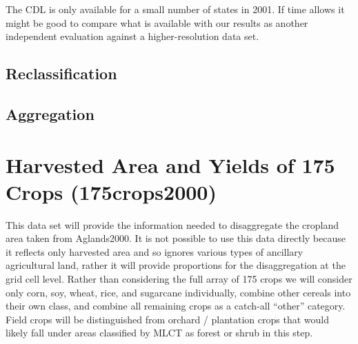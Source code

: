 The CDL is only available for a small number of states in 2001.  If
time allows it might be good to compare what is available with our
results as another independent evaluation against a higher-resolution
data set.

\subsection{Reclassification}
\label{sec:cdl-reclass}


\subsection{Aggregation}
\label{sec:cdl-aggr}


\section{Harvested Area and Yields of 175 Crops (175crops2000)}
\label{sec:175crops2000}

\citet{Monfreda2008}




This data set will provide the information needed to disaggregate the
cropland area taken from Aglands2000.  It is not possible to use this
data directly because it reflects only harvested area and so ignores
various types of ancillary agricultural land, rather it will provide
proportions for the disaggregation at the grid cell level.  Rather
than considering the full array of 175 crops we will consider only
corn, soy, wheat, rice, and sugarcane individually, combine other
cereals into their own class, and combine all remaining crops as a
catch-all ``other'' category.  Field crops will be distinguished from
orchard / plantation crops that would likely fall under areas
classified by MLCT as forest or shrub in this step.


